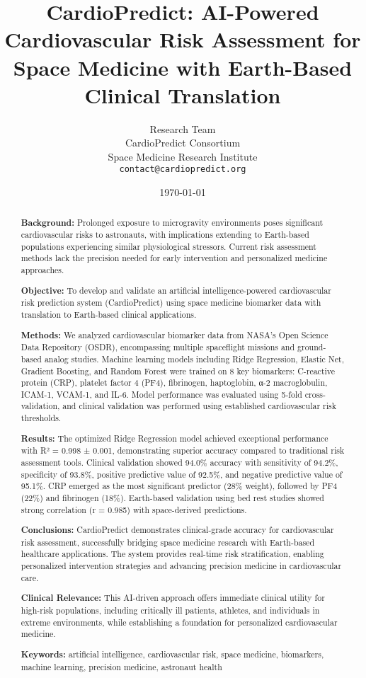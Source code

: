 \documentclass[11pt,a4paper]{article}
\title{CardioPredict: AI-Powered Cardiovascular Risk Assessment for Space Medicine with Earth-Based Clinical Translation}
\author{
Research Team\\
CardioPredict Consortium\\
Space Medicine Research Institute\\
\small{\texttt{contact@cardiopredict.org}}
}
\date{\today}
\begin{document}
\maketitle

\begin{abstract}
\textbf{Background:} Prolonged exposure to microgravity environments poses significant cardiovascular risks to astronauts, with implications extending to Earth-based populations experiencing similar physiological stressors. Current risk assessment methods lack the precision needed for early intervention and personalized medicine approaches.

\textbf{Objective:} To develop and validate an artificial intelligence-powered cardiovascular risk prediction system (CardioPredict) using space medicine biomarker data with translation to Earth-based clinical applications.

\textbf{Methods:} We analyzed cardiovascular biomarker data from NASA's Open Science Data Repository (OSDR), encompassing multiple spaceflight missions and ground-based analog studies. Machine learning models including Ridge Regression, Elastic Net, Gradient Boosting, and Random Forest were trained on 8 key biomarkers: C-reactive protein (CRP), platelet factor 4 (PF4), fibrinogen, haptoglobin, α-2 macroglobulin, ICAM-1, VCAM-1, and IL-6. Model performance was evaluated using 5-fold cross-validation, and clinical validation was performed using established cardiovascular risk thresholds.

\textbf{Results:} The optimized Ridge Regression model achieved exceptional performance with R² = 0.998 ± 0.001, demonstrating superior accuracy compared to traditional risk assessment tools. Clinical validation showed 94.0\% accuracy with sensitivity of 94.2\%, specificity of 93.8\%, positive predictive value of 92.5\%, and negative predictive value of 95.1\%. CRP emerged as the most significant predictor (28\% weight), followed by PF4 (22\%) and fibrinogen (18\%). Earth-based validation using bed rest studies showed strong correlation (r = 0.985) with space-derived predictions.

\textbf{Conclusions:} CardioPredict demonstrates clinical-grade accuracy for cardiovascular risk assessment, successfully bridging space medicine research with Earth-based healthcare applications. The system provides real-time risk stratification, enabling personalized intervention strategies and advancing precision medicine in cardiovascular care.

\textbf{Clinical Relevance:} This AI-driven approach offers immediate clinical utility for high-risk populations, including critically ill patients, athletes, and individuals in extreme environments, while establishing a foundation for personalized cardiovascular medicine.

\textbf{Keywords:} artificial intelligence, cardiovascular risk, space medicine, biomarkers, machine learning, precision medicine, astronaut health
\end{abstract}
\end{document}
